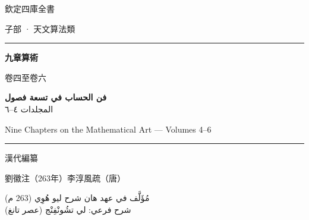 \documentclass[11pt,a4paper]{article}
\begin{document}
\begin{titlepage}
\begin{center}
\vspace*{1.5cm}

{\fontsize{12}{16}\selectfont 欽定四庫全書}

\vspace{0.8cm}

{\fontsize{10}{14}\selectfont 子部 · 天文算法類}

\vspace{1.5cm}

\rule{0.85\textwidth}{1.5pt}

\vspace{0.8cm}

{\fontsize{26}{34}\selectfont\bfseries\color{titlecolor} 九章算術}

\vspace{0.4cm}

{\fontsize{14}{20}\selectfont\color{notecolor} 卷四至卷六}

\vspace{0.6cm}

{\fontsize{18}{24}\selectfont\arabicfont\beginR\color{titlecolor}
\textbf{فن الحساب في تسعة فصول}\\[0.3cm]
{\large المجلدات ٤--٦}\endR}

\vspace{0.4cm}

{\fontsize{14}{18}\selectfont\color{sectioncolor}
Nine Chapters on the Mathematical Art --- Volumes 4--6}

\vspace{0.8cm}

\rule{0.85\textwidth}{1.5pt}

\vspace{1.5cm}

{\fontsize{12}{16}\selectfont 漢代編纂}

\vspace{0.3cm}

{\fontsize{10}{14}\selectfont\color{notecolor} 劉徽注（263年）\quad 李淳風疏（唐）}

\vspace{0.8cm}

{\fontsize{11}{15}\selectfont\arabicfont\beginR\color{notecolor}
مُؤَلَّف في عهد هان \textbullet{} شرح ليو هُوِي (263 م)\\
شرح فرعي: لي تشُونْفِنْج (عصر تانغ)
\endR}


\end{center}
\end{titlepage}
\end{document}

